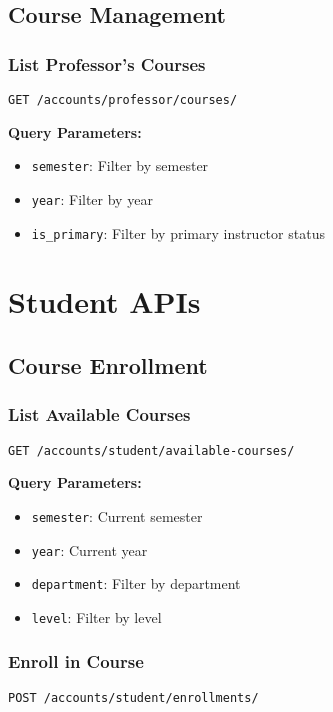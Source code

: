 \documentclass[11pt,a4paper]{article}
\begin{document}
\subsection{Course Management}

\subsubsection{List Professor's Courses}
\begin{lstlisting}[style=http]
GET /accounts/professor/courses/
\end{lstlisting}

\textbf{Query Parameters:}
\begin{itemize}
    \item \texttt{semester}: Filter by semester
    \item \texttt{year}: Filter by year
    \item \texttt{is\_primary}: Filter by primary instructor status
\end{itemize}

\section{Student APIs}

\subsection{Course Enrollment}

\subsubsection{List Available Courses}
\begin{lstlisting}[style=http]
GET /accounts/student/available-courses/
\end{lstlisting}

\textbf{Query Parameters:}
\begin{itemize}
    \item \texttt{semester}: Current semester
    \item \texttt{year}: Current year
    \item \texttt{department}: Filter by department
    \item \texttt{level}: Filter by level
\end{itemize}

\subsubsection{Enroll in Course}
\begin{lstlisting}[style=http]
POST /accounts/student/enrollments/
\end{lstlisting}
\end{document}
